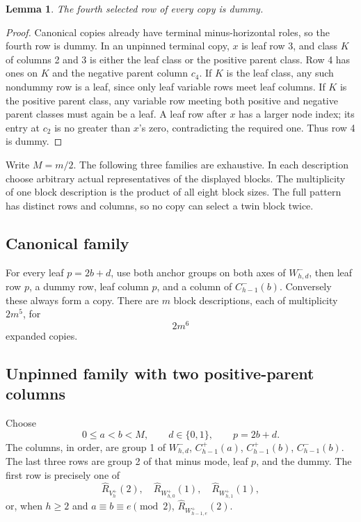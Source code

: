 \documentclass[11pt,a4paper]{article}
\newtheorem{lemma}[theorem]{Lemma}
\theoremstyle{remark}
\newcommand{\ancR}{\widehat R}
\begin{document}
\begin{lemma}\label{lem:dummy}
The fourth selected row of every copy is dummy.
\end{lemma}
\begin{proof}
Canonical copies already have terminal minus-horizontal roles, so
the fourth row is dummy. In an unpinned terminal copy, \(x\) is
leaf row 3, and class \(K\) of columns 2 and 3 is either the leaf
class or the positive parent class. Row 4 has ones on \(K\) and
the negative parent column \(c_4\).
If \(K\) is the leaf class, any such nondummy row is a leaf, since
only leaf variable rows meet leaf columns. If \(K\) is the positive
parent class, any variable row meeting both positive and negative
parent classes must again be a leaf. A leaf row after \(x\) has
a larger node index; its entry at \(c_2\) is no greater than
\(x\)'s zero, contradicting the required one. Thus row 4 is dummy.
\end{proof}

Write \(M=m/2\). The following three families are exhaustive.
In each description choose arbitrary actual representatives of the
displayed blocks. The multiplicity of one block description is the
product of all eight block sizes. The full pattern has distinct
rows and columns, so no copy can select a twin block twice.

\subsection{Canonical family}
For every leaf \(p=2b+d\), use both anchor groups on both axes of
\(W_{h,d}^-\), then leaf row \(p\), a dummy row, leaf column \(p\),
and a column of \(C_{h-1}^-(b)\). Conversely these always form
a copy. There are \(m\) block descriptions, each of multiplicity
\(2m^5\), for
\begin{equation}\label{eq:canonicalcount}
2m^6
\end{equation}
expanded copies.

\subsection{Unpinned family with two positive-parent columns}
Choose
\[
0\le a<b<M,\qquad d\in\{0,1\},\qquad p=2b+d.
\]
The columns, in order, are group 1 of \(W_{h,d}^-\),
\(C_{h-1}^+(a)\), \(C_{h-1}^+(b)\), \(C_{h-1}^-(b)\).
The last three rows are group 2 of that minus mode, leaf \(p\),
and the dummy. The first row is precisely one of
\[
\ancR_{V_h^+}(2),\quad
\ancR_{W_{h,0}^+}(1),\quad
\ancR_{W_{h,1}^+}(1),
\]
or, when \(h\ge2\) and \(a\equiv b\equiv e\pmod2\),
\(\ancR_{W_{h-1,e}^+}(2)\).
\end{document}
